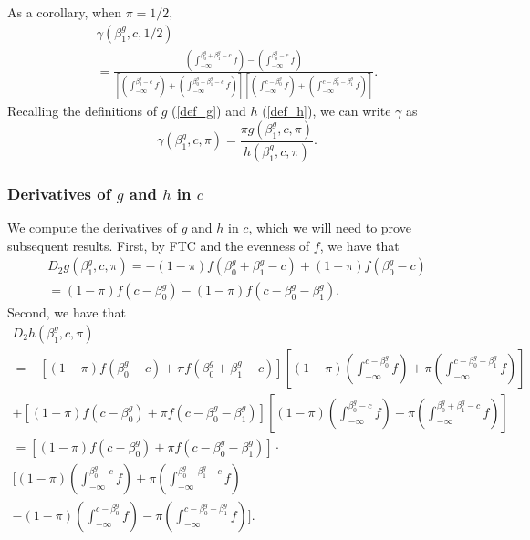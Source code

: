 \documentclass[12pt]{article}
\begin{document}
As a corollary, when $\pi = 1/2$,
\begin{multline}\label{gamma_alternative_pi_half}
\gamma(\beta^g_1, c, 1/2)  \\ = \frac{\left( \int_{ -\infty}^{\beta_0^g + \beta_1^g - c} f \right) - \left( \int_{-\infty}^{ \beta_0^g - c} f \right) }{ \left[ \left( \int_{-\infty}^{ \beta_0^g - c} f \right) + \left( \int_{-\infty}^{ \beta^g_0 + \beta^g_1 - c} f \right) \right] \left[\left( \int_{-\infty}^{c - \beta^g_0} f \right) + \left(\int_{-\infty}^{c - \beta_0^g - \beta_1^g} f \right) \right]}.
\end{multline}
Recalling the definitions of $g$ (\ref{def_g}) and $h$ (\ref{def_h}), we can write $\gamma$ as
$$ \gamma(\beta^g_1, c, \pi) = \frac{\pi g(\beta^g_1, c, \pi)}{h(\beta^g_1, c,\pi)}.$$

\subsubsection{Derivatives of  $g$ and $h$ in $c$}

We compute the derivatives of $g$ and $h$ in $c$, which we will need to prove subsequent results. First, by FTC and the evenness of $f$, we have that
\begin{multline}\label{dg_dc}
D_2 g(\beta^g_1, c, \pi) = -(1-\pi)f( \beta^g_0 + \beta^g_1 - c ) + (1-\pi) f(\beta^g_0 - c) \\ = (1-\pi) f(c - \beta^g_0) - (1-\pi)f(c - \beta^g_0 - \beta^g_1).
\end{multline}
Second, we have that
\begin{multline}\label{dh_dc}
D_2 h(\beta^g_1, c, \pi) \\ = -[(1-\pi)f(\beta^g_0 - c) + \pi f( \beta^g_0 + \beta^g_1 - c )]\left[(1-\pi)\left(\int_{-\infty}^{c - \beta^g_0} f \right) + \pi \left(\int_{-\infty}^{c - \beta_0^g - \beta_1^g} f \right) \right] \\ + [(1-\pi) f(c - \beta^g_0) +  \pi f(c - \beta^g_0 - \beta^g_1)] \left[(1-\pi)\left( \int_{-\infty}^{\beta_0^g - c} f \right) + \pi \left(\int_{-\infty}^{ \beta^g_0 + \beta^g_1 - c} f \right) \right] \\ = \left[ (1-\pi) f(c - \beta^g_0) +  \pi f(c - \beta^g_0 - \beta^g_1) \right] \cdot \\ \bigg[ (1-\pi)\left( \int_{-\infty}^{\beta_0^g - c} f \right) + \pi \left(\int_{-\infty}^{ \beta^g_0 + \beta^g_1 - c} f \right) \\ - (1-\pi)\left(\int_{-\infty}^{c - \beta^g_0} f \right) - \pi \left(\int_{-\infty}^{c - \beta_0^g - \beta_1^g} f \right) \bigg].
\end{multline}
\end{document}
